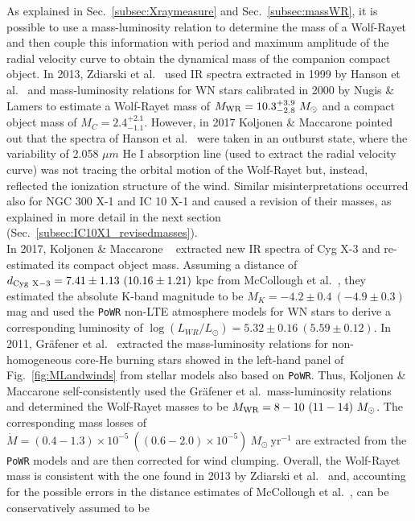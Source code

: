 \documentclass[a4paper,titlepage]{book}     	%
\newcommand{\sun}{\ensuremath{_\odot}}
\newcommand{\mdot}{\ensuremath{\dot{M}}}
\newcommand{\msun}{\ensuremath{M\sun}}
\newcommand{\lsun}{L_{\odot}}
\newcommand{\yr}{\text{yr}}
\newcommand{\mwr}{\ensuremath{M_\textup{WR}}}
\begin{document}
As explained in Sec.\ \ref{subsec:Xraymeasure} and Sec.\ \ref{subsec:massWR}, it is possible to use a mass-luminosity relation to determine the mass of a Wolf-Rayet and then couple this information with period and maximum amplitude of the radial velocity curve to obtain the dynamical mass of the companion compact object. In 2013, Zdiarski et al.\ \cite{Cyg-X3_Zd2013} used IR spectra extracted in 1999 by Hanson et al.\ \cite{CygX-3_Hanson2000wrongspectrum} and mass-luminosity relations for WN stars calibrated in 2000 by Nugis \& Lamers \cite{Nugis2000_WRwinds} to estimate a Wolf-Rayet mass of $\mwr = 10.3_{-2.8}^{+3.9}~\msun$ and a compact object mass of $M_C = 2.4_{-1.1}^{+2.1}$. However, in 2017 Koljonen \& Maccarone \cite{CygX-3_Koljonen2017} pointed out that the spectra of Hanson et al.\ \cite{CygX-3_Hanson2000wrongspectrum} were taken in an outburst state, where the variability of 2.058 $\mu m$ He I absorption line (used to extract the radial velocity curve) was not tracing the orbital motion of the Wolf-Rayet but, instead, reflected the ionization structure of the wind. Similar misinterpretations occurred also for NGC 300 X-1 and IC 10 X-1 and caused a revision of their masses, as explained in more detail in the next section (Sec.\ \ref{subsec:IC10X1_revisedmasses}). \\

In 2017, Koljonen \& Maccarone \ \cite{CygX-3_Koljonen2017} extracted new IR spectra of Cyg X-3 and re-estimated its compact object mass. Assuming a distance of $d_{\rm Cyg~X-3} = 7.41 \pm 1.13~ (10.16 \pm 1.21)$ kpc from McCollough et al.\ \cite{CygX-3_McCollough2016_Observation}, they estimated the absolute K-band magnitude to be $M_K = -4.2 \pm 0.4~(-4.9 \pm 0.3)$ mag and used the \texttt{PoWR} non-LTE atmosphere models for WN stars \cite{WRnonLTEatmospheresPoWR_Todt2015} to derive a corresponding luminosity of $\log(L_{WR}/\lsun) = 5.32 \pm 0.16~(5.59 \pm 0.12)$. In 2011, Gr{\"a}fener et al.\ \cite{Grafener2011_M-L_WR} extracted the mass-luminosity relations for non-homogeneous core-He burning stars showed in the left-hand panel of Fig.\ \ref{fig:MLandwinds} from stellar models also based on \texttt{PoWR}. Thus, Koljonen \& Maccarone self-consistently used the Gr{\"a}fener et al.\  mass-luminosity relations and determined the Wolf-Rayet masses to be $\mwr = 8-10~(11-14)~\msun$. The corresponding mass losses of $\mdot = (0.4-1.3) \times 10^{-5}~((0.6-2.0)\times 10^{-5})~\msun~\yr^{-1}$ are extracted from the \texttt{PoWR} models and are then corrected for wind clumping. Overall, the Wolf-Rayet mass is consistent with the one found in 2013 by Zdiarski et al.\ \cite{Cyg-X3_Zd2013} and, accounting for the possible errors in the distance estimates of McCollough et al.\ \cite{CygX-3_McCollough2016_Observation}, can be conservatively assumed to be
\end{document}

